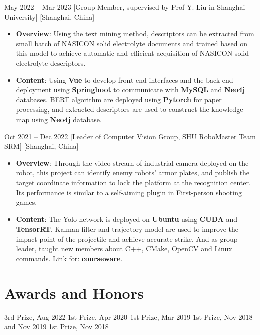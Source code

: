 \documentclass{chicv}
\begin{document}
  {May 2022 -- Mar 2023}
  [Group Member, supervised by Prof Y. Liu in Shanghai University]
  [Shanghai, China]
  \begin{itemize}
    \item \textbf{Overview}: Using the text mining method, descriptors can be extracted from small batch of NASICON solid electrolyte documents and trained based on this model to achieve automatic and efficient acquisition of NASICON solid electrolyte descriptors.
    \item \textbf{Content}: Using \textbf{Vue} to develop front-end interfaces and the back-end deployment using \textbf{Springboot} to communicate with \textbf{MySQL} and \textbf{Neo4j} databases. BERT algorithm are deployed using \textbf{Pytorch} for paper processing, and extracted descriptors are used to construct the knowledge map using \textbf{Neo4j} database.
  \end{itemize}

  {Oct 2021 -- Dec 2022}
  [Leader of Computer Vision Group, SHU RoboMaster Team SRM]
  [Shanghai, China]
  \begin{itemize}
    \item \textbf{Overview}: Through the video stream of industrial camera deployed on the robot, this project can identify enemy robots' armor plates, and publish the target coordinate information to lock the platform at the recognition center. Its performance is similar to a self-aiming plugin in First-person shooting games.
    \item \textbf{Content}: The Yolo network is deployed on \textbf{Ubuntu} using \textbf{CUDA} and \textbf{TensorRT}. Kalman filter and trajectory model are used to improve the impact point of the projectile and achieve accurate strike. And as group leader, taught new members about C++, CMake, OpenCV and Linux commands. Link for: \href{https://shuzheking.github.io/documents.html}{\textbf{courseware}}.
  \end{itemize}

\section{Awards and Honors}
 {3rd Prize, Aug 2022}
 {1st Prize, Apr 2020}
 {1st Prize, Mar 2019}
 {1st Prize, Nov 2018 and Nov 2019}
 {1st Prize, Nov 2018}
\end{document}
